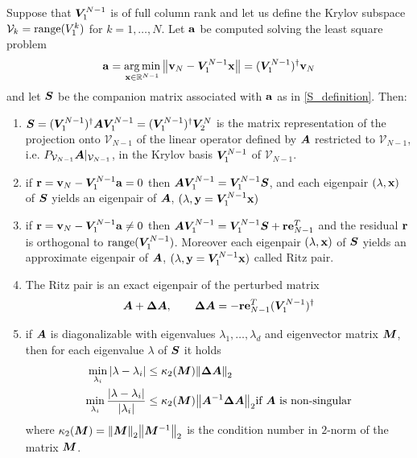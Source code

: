 \begin{prop}
Suppose that $\vb*{V}_1^{N-1}$ is of full column rank and let us define the Krylov subspace $\mathcal{V}_k = \mathrm{range}(V_1^k)$ for $k = 1, \dots, N$. Let $\vb{a}$ be computed solving the least square problem 
\begin{equation*}
    \vb{a} = \operatorname*{arg\,min}_{\vb{x}\in\mathbb{R}^{N-1}}\norm{\vb{v}_N - \vb*{V}_1^{N-1}\vb{x}} = (\vb*{V}_1^{N-1})^{\dagger}\vb{v}_N
\end{equation*}
and let $\vb*{S}$ be the companion matrix associated with $\vb{a}$ as in \eqref{S_definition}. Then:
\begin{enumerate}[label=(\roman*)]
    \item $\vb*{S} = (\vb*{V}_1^{N-1})^{\dagger}\vb*{A}\vb*{V}_1^{N-1} = (\vb*{V}_1^{N-1})^{\dagger}\vb*{V}_2^{N}$ is the matrix representation of the projection onto $\mathcal{V}_{N-1}$ of the linear operator defined by $\vb*{A}$ restricted to $\mathcal{V}_{N-1}$, i.e. $P_{\mathcal{V}_{N-1}}\vb*{A}\rvert_{\mathcal{V}_{N-1}}$, in the Krylov basis $\vb*{V}_1^{N-1}$ of  $\mathcal{V}_{N-1}$.
    \item if $\vb{r} = \vb{v}_N - \vb*{V}_1^{N-1}\vb{a} = 0$ then $\vb*{A}\vb*{V}_1^{N-1}  = \vb*{V}_1^{N-1}\vb*{S}$, and each eigenpair $(\lambda, \vb{x})$ of $\vb*{S}$ yields an eigenpair of $\vb*{A}$, $(\lambda, \vb{y} = \vb*{V}_1^{N-1}\vb{x})$ 
    \item if $\vb{r} = \vb{v}_N - \vb*{V}_1^{N-1}\vb{a} \neq 0$ then $\vb*{A}\vb*{V}_1^{N-1}  = \vb*{V}_1^{N-1}\vb*{S} + \vb{r}\vb{e}_{N-1}^T$ and the residual $\vb{r}$ is orthogonal to $\mathrm{range}(\vb*{V}_1^{N-1})$. Moreover each eigenpair $(\lambda, \vb{x})$ of $\vb*{S}$ yields an approximate eigenpair of $\vb*{A}$, $(\lambda, \vb{y} = \vb*{V}_1^{N-1}\vb{x})$ called Ritz pair.
    \item The Ritz pair is an exact eigenpair of the perturbed matrix 
    \begin{equation}
        \label{delta_def}
        \vb*{A} + \vb*{\Delta A}, \qquad \vb*{\Delta A} = - \vb{r}\vb{e}_{N-1}^T (\vb*{V}_1^{N-1})^{\dagger}
    \end{equation}
    \item if $\vb*{A}$ is diagonalizable with eigenvalues $\lambda_1, \dots, \lambda_d$ and eigenvector matrix $\vb*{M}$, then for each eigenvalue $\lambda$ of $\vb*{S}$ it holds
    \begin{equation*}
    \begin{split}
        \min_{\lambda_i}\abs{\lambda - \lambda_i} &\leq \kappa_2(\vb*{M})\norm{\vb*{\Delta A}}_2 \\
        \min_{\lambda_i}\frac{\abs{\lambda - \lambda_i}}{\abs{\lambda_i}} &\leq \kappa_2(\vb*{M})\norm{\vb*{A}^{-1}\vb*{\Delta A}}_2 \text{if $\vb*{A}$ is non-singular}
    \end{split}
    \end{equation*}
    where $\kappa_2(\vb*{M}) = \norm{\vb*{M}}_2\norm{\vb*{M}^{-1}}_2$ is the condition number in $2$-norm of the matrix $\vb*{M}$.
\end{enumerate} 
\end{prop}
